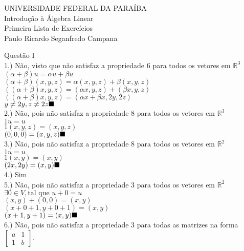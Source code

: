\documentclass[12pt]{article}
\begin{document}
\pagestyle{empty}

\begin{center}
	UNIVERSIDADE FEDERAL DA PARAÍBA\\
	Introdução à Álgebra Linear\\
	Primeira Lista de Exercícios\\
	Paulo Ricardo Seganfredo Campana\\
\end{center}
	
Questão I\\
1.) Não, visto que não satisfaz a propriedade 6 para todos os vetores em $\mathds{R}^{3}$\\
$(\alpha + \beta)u = \alpha u + \beta u$\\
$(\alpha + \beta)(x,y,z) = \alpha (x,y,z) + \beta (x,y,z)$\\
$((\alpha + \beta)x,y,z) = (\alpha x,y,z) + (\beta x,y,z)$\\
$((\alpha + \beta)x,y,z) = (\alpha x + \beta x, 2y, 2z)$\\
$y \neq 2y, z \neq 2z\hfill\blacksquare$\\

2.) Não, pois não satisfaz a propriedade 8 para todos os vetores em $\mathds{R}^{3}$\\
$1u = u$\\
$1(x,y,z) = (x,y,z)$\\
$(0,0,0) = (x,y,z)\hfill\blacksquare$\\

3.)  Não, pois não satisfaz a propriedade 8 para todos os vetores em $\mathds{R}^{2}$\\
$1u = u$\\
$1(x,y) = (x,y)$\\
$(2x,2y)=(x,y)\hfill\blacksquare$\\

4.) Sim\\

5.) Não, pois não satisfaz a propriedade 3 para todos os vetores em $\mathds{R}^{2}$\\
$\exists0\in V, \text{tal que }u+0=u$\\
$(x,y)+(0,0)=(x,y)$\\
$(x+0+1,y+0+1)=(x,y)$\\
$(x+1,y+1)=(x,y)\hfill\blacksquare$\\

6.) Não, pois não satisfaz a propriedade 3 para todas as matrizes na forma 
$\begin{bmatrix}
	a & 1 \\
	1 & b
\end{bmatrix}$.\\
\end{document}

